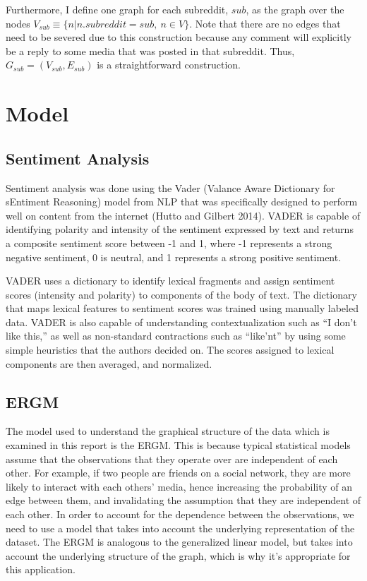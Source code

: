 \documentclass[
]{article}
\begin{document}
Furthermore, I define one graph for each subreddit, \(sub\), as the graph over the nodes \(V_{sub}\equiv\{n|n.subreddit=sub,\ n\in V\}\). Note that there are no edges that need to be severed due to this construction because any comment will explicitly be a reply to some media that was posted in that subreddit. Thus, \(G_{sub}=(V_{sub},E_{sub})\) is a straightforward construction.

\hypertarget{model}{%
\section{Model}\label{model}}

\hypertarget{sentiment-analysis}{%
\subsection{Sentiment Analysis}\label{sentiment-analysis}}

Sentiment analysis was done using the Vader (Valance Aware Dictionary for sEntiment Reasoning) model from NLP that was specifically designed to perform well on content from the internet (Hutto and Gilbert 2014). VADER is capable of identifying polarity and intensity of the sentiment expressed by text and returns a composite sentiment score between -1 and 1, where -1 represents a strong negative sentiment, 0 is neutral, and 1 represents a strong positive sentiment.

VADER uses a dictionary to identify lexical fragments and assign sentiment scores (intensity and polarity) to components of the body of text. The dictionary that maps lexical features to sentiment scores was trained using manually labeled data. VADER is also capable of understanding contextualization such as ``I don't like this,'' as well as non-standard contractions such as ``like'nt'' by using some simple heuristics that the authors decided on. The scores assigned to lexical components are then averaged, and normalized.

\hypertarget{ergm}{%
\subsection{ERGM}\label{ergm}}

The model used to understand the graphical structure of the data which is examined in this report is the ERGM. This is because typical statistical models assume that the observations that they operate over are independent of each other. For example, if two people are friends on a social network, they are more likely to interact with each others' media, hence increasing the probability of an edge between them, and invalidating the assumption that they are independent of each other. In order to account for the dependence between the observations, we need to use a model that takes into account the underlying representation of the dataset. The ERGM is analogous to the generalized linear model, but takes into account the underlying structure of the graph, which is why it's appropriate for this application.
\end{document}
